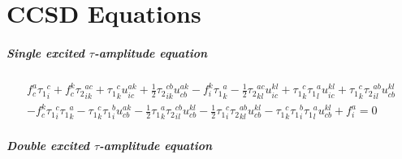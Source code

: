 \chapter{CCSD Equations}
\label{app:ccsd_equations}

\paragraph{Single excited $\tau$-amplitude equation}

\begin{gather*}
f^{a}_{c} {\tau_1}^{c}_{i} 
+ f^{k}_{c} {\tau_2}^{ac}_{ik} 
+ {\tau_1}^{c}_{k} u^{ak}_{ic}
+ \frac{1}{2}{\tau_2}^{cb}_{ik} u^{ak}_{cb} 
- f^{k}_{i} {\tau_1}^{a}_{k}
- \frac{1}{2}{\tau_2}^{ac}_{kl} u^{kl}_{ic}
+ {\tau_1}^{c}_{k} {\tau_1}^{a}_{l} u^{kl}_{ic} 
 + {\tau_1}^{c}_{k} {\tau_2}^{ab}_{il} u^{kl}_{cb} \\
- f^{k}_{c} {\tau_1}^{c}_{i} {\tau_1}^{a}_{k}
- {\tau_1}^{c}_{k} {\tau_1}^{b}_{i} u^{ak}_{cb}
- \frac{1}{2}{\tau_1}^{a}_{k} {\tau_2}^{cb}_{il} u^{kl}_{cb}
- \frac{1}{2}{\tau_1}^{c}_{i} {\tau_2}^{ab}_{kl} u^{kl}_{cb}
- {\tau_1}^{c}_{k} {\tau_1}^{b}_{i} {\tau_1}^{a}_{l} u^{kl}_{cb}
+ f^{a}_{i}
= 0
\end{gather*}

\paragraph{Double excited $\tau$-amplitude equation}

